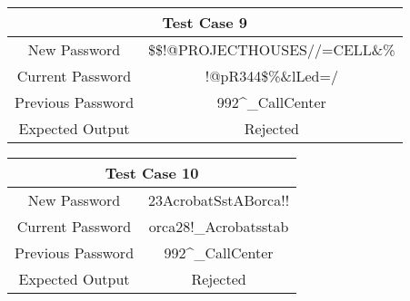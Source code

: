 \documentclass[12pt,letterpaper]{article}
\begin{document}
\begin{table}[h]
\begin{centering}
\begin{tabular}{||c|c||}
  \hline
  \multicolumn{2}{||c||}{Test Case 9} \\
  \hline
  New Password & \$\$!@PROJECTHOUSES//=CELL\&\% \\
  \hline
  Current Password & !@pR344\$\%\&lLed=/ \\
  \hline
  Previous Password & 992\^{}\_CallCenter \\
  \hline
  Expected Output & Rejected \\
  \hline
  \end{tabular}
  \begin{tabular}{||c|c||}
  \hline
  \multicolumn{2}{||c||}{Test Case 10} \\
  \hline
  New Password & 23AcrobatSstABorca!! \\
  \hline
  Current Password & orca28!\_Acrobatsstab \\
  \hline
  Previous Password & 992\^{}\_CallCenter \\
  \hline
  Expected Output & Rejected \\
  \hline
  \end{tabular}



\end{centering}


\end{table}
\end{document}
